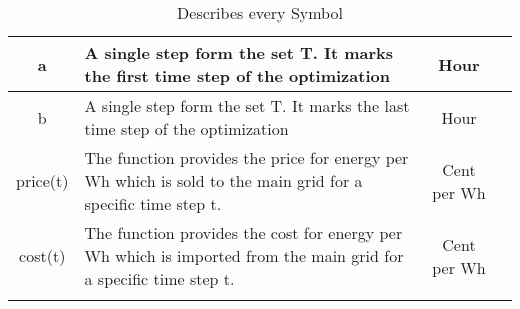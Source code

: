 \begin{longtable}{|c|p{}|c|c|}
		a & A single step form the set T. It marks the first time step of the optimization & Hour & \Cref{eq:opt} \\ \midrule
		b & A single step form the set T. It marks the last time step of the optimization & Hour & \Cref{eq:opt} \\ \midrule
		price(t) & The function provides the price for energy per Wh which is sold to the main grid for a specific time step t. & Cent per Wh & \Cref{eq:opt} \\ \midrule
		cost(t) & The function provides the cost for energy per Wh which is imported from the main grid for a specific time step t. & Cent per Wh& \Cref{eq:opt} \\
		\bottomrule
			\caption[Nomenclature Table]{Describes every Symbol}
		\label{tab:Ergebnisse}
	\end{longtable}



